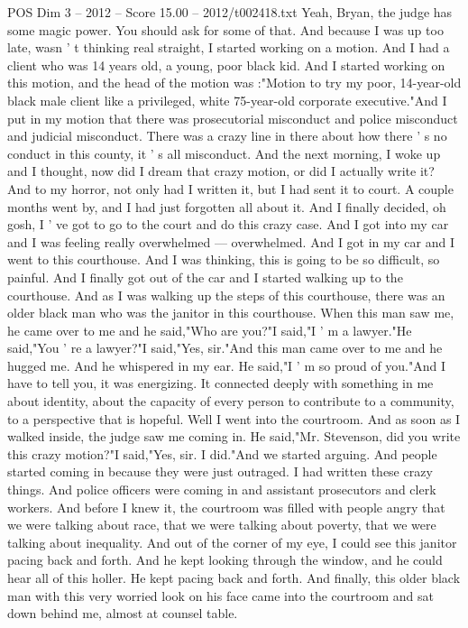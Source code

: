\begin{textsample}{POS Dim 3 – 2012 – Score 15.00 – 2012/t002418.txt}
Yeah, Bryan, the judge has some magic power.
You should ask for some of that.
And because I was up too late, wasn ' t thinking real straight, I started working on a motion.
And I had a client who was 14 years old, a young, poor black kid.
And I started working on this motion, and the head of the motion was :"Motion to try my poor, 14-year-old black male client like a privileged, white 75-year-old corporate executive."And I put in my motion that there was prosecutorial misconduct and police misconduct and judicial misconduct.
There was a crazy line in there about how there ' s no conduct in this county, it ' s all misconduct.
And the next morning, I woke up and I thought, now did I dream that crazy motion, or did I actually write it?
And to my horror, not only had I written it, but I had sent it to court.
A couple months went by, and I had just forgotten all about it.
And I finally decided, oh gosh, I ' ve got to go to the court and do this crazy case.
And I got into my car and I was feeling really overwhelmed — overwhelmed.
And I got in my car and I went to this courthouse.
And I was thinking, this is going to be so difficult, so painful.
And I finally got out of the car and I started walking up to the courthouse.
And as I was walking up the steps of this courthouse, there was an older black man who was the janitor in this courthouse.
When this man saw me, he came over to me and he said,"Who are you?"I said,"I ' m a lawyer."He said,"You ' re a lawyer?"I said,"Yes, sir."And this man came over to me and he hugged me.
And he whispered in my ear.
He said,"I ' m so proud of you."And I have to tell you, it was energizing.
It connected deeply with something in me about identity, about the capacity of every person to contribute to a community, to a perspective that is hopeful.
Well I went into the courtroom.
And as soon as I walked inside, the judge saw me coming in.
He said,"Mr.
Stevenson, did you write this crazy motion?"I said,"Yes, sir.
I did."And we started arguing.
And people started coming in because they were just outraged.
I had written these crazy things.
And police officers were coming in and assistant prosecutors and clerk workers.
And before I knew it, the courtroom was filled with people angry that we were talking about race, that we were talking about poverty, that we were talking about inequality.
And out of the corner of my eye, I could see this janitor pacing back and forth.
And he kept looking through the window, and he could hear all of this holler.
He kept pacing back and forth.
And finally, this older black man with this very worried look on his face came into the courtroom and sat down behind me, almost at counsel table.

\end{textsample}
